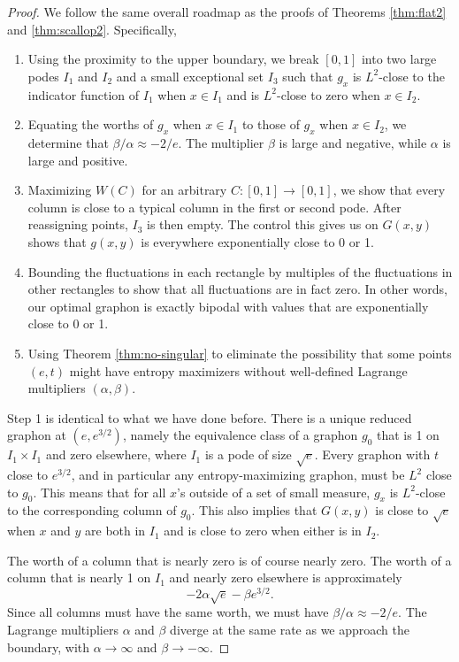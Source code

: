 \documentclass[10pt,a4paper]{amsart}
\newcommand\be{\begin{equation}}
\newcommand\ee{\end{equation}}
\newcommand{\Values}{worths}
\newcommand{\Value}{worth}
\begin{document}
\begin{proof}
We follow the same overall roadmap as 
the proofs of Theorems \ref{thm:flat2} and \ref{thm:scallop2}. 
Specifically, 
\begin{enumerate}
\item Using the proximity to the upper boundary, we break $[0,1]$
into two large podes $I_1$ and $I_2$ and a small exceptional set 
$I_3$ such 
that $g_x$ is $L^2$-close to the indicator function of $I_1$ when
$x \in I_1$ and is $L^2$-close to zero when $x \in I_2$. 
\item Equating the \Values{} of $g_x$ when $x \in I_1$ to those of 
$g_x$ when $x \in I_2$, we determine that $\beta/\alpha
\approx -2/e$. The multiplier $\beta$ is large and negative,
while $\alpha$ is large and positive. 
\item Maximizing $W(C)$ for an arbitrary $C: [0,1] \to [0,1]$, we show 
that every column is close to a typical column in the first or second
pode. After reassigning points,
$I_3$ is then empty. The control this gives us on $G(x,y)$ shows that 
$g(x,y)$ is everywhere exponentially close to 0 or 1.
\item Bounding the fluctuations in each rectangle by multiples 
of the fluctuations in other rectangles to show that all 
fluctuations are in fact zero. In other words, our optimal graphon is 
exactly bipodal with values that are exponentially close to 0 or 1. 
\item Using Theorem \ref{thm:no-singular} to eliminate the possibility
that some points $(e,t)$ might have entropy maximizers without well-defined Lagrange multipliers 
$(\alpha, \beta)$.
\end{enumerate}

Step 1 is identical to what we have done before. There is a 
unique reduced graphon at $(e, e^{3/2})$,
namely the equivalence class of a graphon $g_0$ that is 1 on $I_1 \times I_1$ and zero elsewhere, where $I_1$ is a pode of size $\sqrt{e}$. Every graphon with $t$ 
close to $e^{3/2}$, and in particular any entropy-maximizing graphon,
must be $L^2$ close to $g_0$. This means that for all $x$'s outside
of a set of small measure, $g_x$ is $L^2$-close to the corresponding
column of $g_0$. This also implies that $G(x,y)$ is close to $\sqrt{e}$
when $x$ and $y$ are both in $I_1$ and is close to zero when either
is in $I_2$. 

The \Value{} of a column that is nearly zero is of course nearly zero.
The \Value{} of a column that is nearly 1 on $I_1$ and nearly zero
elsewhere is approximately 
\be - 2\alpha \sqrt{e} - \beta e^{3/2}. \ee
Since all columns must have the same \Value, we must have 
$\beta/\alpha \approx -2/e$. The Lagrange multipliers $\alpha$
and $\beta$ diverge at the same rate as we approach the boundary,
with $\alpha \to \infty$ and $\beta \to -\infty$. 


\end{proof}
\end{document}
